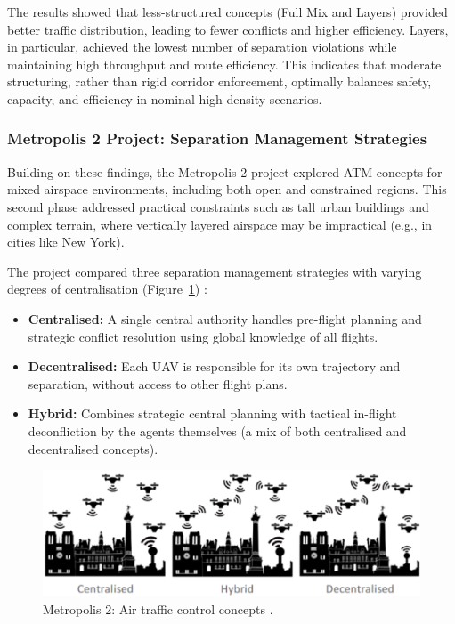 The results showed that less-structured concepts (Full Mix and Layers) provided better traffic distribution, leading to fewer conflicts and higher efficiency. 
Layers, in particular, achieved the lowest number of separation violations while maintaining high throughput and route efficiency. 
This indicates that moderate structuring, rather than rigid corridor enforcement, optimally balances safety, capacity, and efficiency in nominal high-density scenarios.


\subsubsection{Metropolis 2 Project: Separation Management Strategies}

Building on these findings, the Metropolis 2 project explored \gls{ATM} concepts for mixed airspace environments, including both open and constrained regions. 
This second phase addressed practical constraints such as tall urban buildings and complex terrain, where vertically layered airspace may be impractical (e.g., in cities like New York).

The project compared three separation management strategies with varying degrees of centralisation (Figure~\ref{atc-concepts}) \cite{Patrinopoulou_2022}:

\begin{itemize}
    \item \textbf{Centralised:} A single central authority handles pre-flight planning and strategic conflict resolution using global knowledge of all flights.
    \item \textbf{Decentralised:} Each \gls{UAV} is responsible for its own trajectory and separation, without access to other flight plans.
    \item \textbf{Hybrid:} Combines strategic central planning with tactical in-flight deconfliction by the agents themselves (a mix of both centralised and decentralised concepts).
\end{itemize}

\begin{figure}[!ht]
    \centering
    \includegraphics[width=.7\textwidth]{img/metropolis-ii-airspace.png}
    \caption{Metropolis 2: Air traffic control concepts \cite{Badea_2022}.}
    \label{atc-concepts}
\end{figure}

